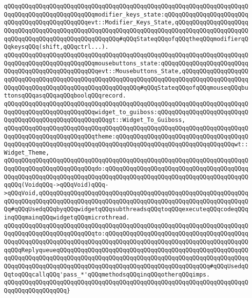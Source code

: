 \verb|qQQqqQQqqQQqqQQqqQQqqQQqqQQqqQQqqQQqqQQqqQQqqQQqqQQqqQQqqQQqqQQqqQQqqQQqqQQqqQQqqQQqqQQqqQQqqQQqmodifier_keys_state:qQQqqQQqqQQqqQQqqQQqqQQqqQQqqQQqqQQqqQQqqQQqqQQqevt::Modifier_Keys_State,qQQqqQQqqQQqqQQqqQQqqQQqqQQqqQQqqQQqqQQqqQQqqQQqqQQqqQQqqQQqqQQqqQQqqQQqqQQqqQQqqQQqqQQqqQQqqQQqqQQqqQQqqQQqqQQqqQQqqQQqqQQq#qQQqStateqQQqofqQQqtheqQQqmodifierqQQqkeysqQQq(shift,qQQqctrl...).|\newline
\verb|qQQqqQQqqQQqqQQqqQQqqQQqqQQqqQQqqQQqqQQqqQQqqQQqqQQqqQQqqQQqqQQqqQQqqQQqqQQqqQQqqQQqqQQqqQQqqQQqmousebuttons_state:qQQqqQQqqQQqqQQqqQQqqQQqqQQqqQQqqQQqqQQqqQQqqQQqqQQqevt::Mousebuttons_State,qQQqqQQqqQQqqQQqqQQqqQQqqQQqqQQqqQQqqQQqqQQqqQQqqQQqqQQqqQQqqQQqqQQqqQQqqQQqqQQqqQQqqQQqqQQqqQQqqQQqqQQqqQQqqQQqqQQqqQQqqQQqqQQq#qQQqStateqQQqofqQQqmouseqQQqbuttonsqQQqasqQQqaqQQqboolqQQqrecord.|\newline
\verb|qQQqqQQqqQQqqQQqqQQqqQQqqQQqqQQqqQQqqQQqqQQqqQQqqQQqqQQqqQQqqQQqqQQqqQQqqQQqqQQqqQQqqQQqqQQqqQQqwidget_to_guiboss:qQQqqQQqqQQqqQQqqQQqqQQqqQQqqQQqqQQqqQQqqQQqqQQqqQQqqQQqgt::Widget_To_Guiboss,|\newline
\verb|qQQqqQQqqQQqqQQqqQQqqQQqqQQqqQQqqQQqqQQqqQQqqQQqqQQqqQQqqQQqqQQqqQQqqQQqqQQqqQQqqQQqqQQqqQQqqQQqtheme:qQQqqQQqqQQqqQQqqQQqqQQqqQQqqQQqqQQqqQQqqQQqqQQqqQQqqQQqqQQqqQQqqQQqqQQqqQQqqQQqqQQqqQQqqQQqqQQqqQQqqQQqwt::Widget_Theme,|\newline
\verb|qQQqqQQqqQQqqQQqqQQqqQQqqQQqqQQqqQQqqQQqqQQqqQQqqQQqqQQqqQQqqQQqqQQqqQQqqQQqqQQqqQQqqQQqqQQqqQQqdo:qQQqqQQqqQQqqQQqqQQqqQQqqQQqqQQqqQQqqQQqqQQqqQQqqQQqqQQqqQQqqQQqqQQqqQQqqQQqqQQqqQQqqQQqqQQqqQQqqQQqqQQqqQQqqQQqqQQq(VoidqQQq->qQQqVoid)qQQq->qQQqVoid,qQQqqQQqqQQqqQQqqQQqqQQqqQQqqQQqqQQqqQQqqQQqqQQqqQQqqQQqqQQqqQQqqQQqqQQqqQQqqQQqqQQqqQQqqQQqqQQqqQQqqQQqqQQqqQQqqQQqqQQqqQQqqQQqqQQq#qQQqUsedqQQqbyqQQqwidgetqQQqsubthreadsqQQqtoqQQqexecuteqQQqcodeqQQqinqQQqmainqQQqwidgetqQQqmicrothread.|\newline
\verb|qQQqqQQqqQQqqQQqqQQqqQQqqQQqqQQqqQQqqQQqqQQqqQQqqQQqqQQqqQQqqQQqqQQqqQQqqQQqqQQqqQQqqQQqqQQqqQQqto:qQQqqQQqqQQqqQQqqQQqqQQqqQQqqQQqqQQqqQQqqQQqqQQqqQQqqQQqqQQqqQQqqQQqqQQqqQQqqQQqqQQqqQQqqQQqqQQqqQQqqQQqqQQqqQQqqQQqReplyqueueqQQqqQQqqQQqqQQqqQQqqQQqqQQqqQQqqQQqqQQqqQQqqQQqqQQqqQQqqQQqqQQqqQQqqQQqqQQqqQQqqQQqqQQqqQQqqQQqqQQqqQQqqQQqqQQqqQQqqQQqqQQqqQQqqQQqqQQqqQQqqQQqqQQqqQQqqQQqqQQqqQQqqQQqqQQqqQQqqQQqqQQq#qQQqUsedqQQqtoqQQqcallqQQq'pass_*'qQQqmethodsqQQqinqQQqotherqQQqimps.|\newline
\verb|qQQqqQQqqQQqqQQqqQQqqQQqqQQqqQQqqQQqqQQqqQQqqQQqqQQqqQQqqQQqqQQqqQQqqQQqqQQqqQQqqQQqqQQq}|\newline
